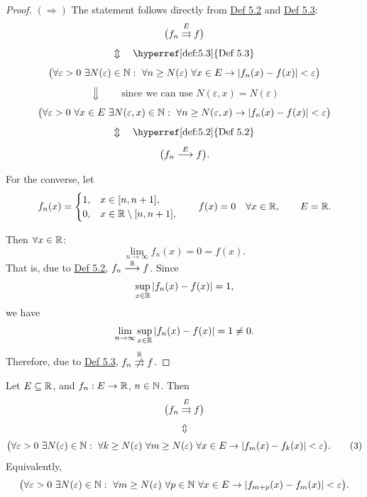 \begin{proof}
$(\Rightarrow)$ The statement follows directly from \hyperref[def:5.2]{Def 5.2} and \hyperref[def:5.3]{Def 5.3}:
\[
\bigl(f_n\mathrel{\overset{E}{\rightrightarrows}}f\bigr)
\]
\[
\Updownarrow\quad\text{\hyperref[def:5.3]{Def 5.3}}
\]
\[
\bigl(\forall\varepsilon>0\ \exists N(\varepsilon)\in\mathbb{N}:\ \forall n\ge N(\varepsilon)\ \forall x\in E
\to |f_n(x)-f(x)|<\varepsilon\bigr)
\]
\[
\Downarrow\qquad\text{since we can use }N(\varepsilon,x)=N(\varepsilon)
\]
\[
\bigl(\forall\varepsilon>0\ \forall x\in E\ \exists N(\varepsilon,x)\in\mathbb{N}:\ \forall n\ge N(\varepsilon,x)
\to |f_n(x)-f(x)|<\varepsilon\bigr)
\]
\[
\Updownarrow\quad\text{\hyperref[def:5.2]{Def 5.2}}
\]
\[
\bigl(f_n\mathrel{\overset{E}{\longrightarrow}}f\bigr).
\]

For the converse, let
\[
f_n(x)=
\begin{cases}
1,&x\in[n,n+1],\\
0,&x\in\mathbb{R}\setminus[n,n+1],
\end{cases}
\qquad
f(x)=0\quad\forall x\in\mathbb{R},
\qquad E=\mathbb{R}.
\]

Then $\forall x\in\mathbb{R}$:
\[
\lim_{n\to\infty}f_n(x)=0=f(x).
\]
That is, due to \hyperref[def:5.2]{Def 5.2}, $f_n\mathrel{\overset{\mathbb{R}}{\longrightarrow}}f$.
Since
\[
\sup_{x\in\mathbb{R}}|f_n(x)-f(x)|=1,
\]
we have
\[
\lim_{n\to\infty}\sup_{x\in\mathbb{R}}|f_n(x)-f(x)|=1\ne0.
\]
Therefore, due to \hyperref[def:5.3]{Def 5.3}, $f_n\nuconv{\R}f$.
\end{proof}

\begin{claim}\label{claim:5.4}
Let $E\subseteq\mathbb{R}$, and $f_n:E\to\mathbb{R}$, $n\in\mathbb{N}$.
Then
\[
\bigl(f_n\mathrel{\overset{E}{\rightrightarrows}}f\bigr)
\]
\[
\Updownarrow
\]
\[
\bigl(\forall\varepsilon>0\ \exists N(\varepsilon)\in\mathbb{N}:\ \forall k\ge N(\varepsilon)\ \forall m\ge N(\varepsilon)\ \forall x\in E
\to |f_m(x)-f_k(x)|<\varepsilon\bigr).
\tag{3}\label{eq:5:3:1}
\]
Equivalently,
\[
\bigl(\forall\varepsilon>0\ \exists N(\varepsilon)\in\N:\ \forall m\ge N(\varepsilon)\ \forall p\in\N\ \forall x\in E
\to |f_{m+p}(x)-f_m(x)|<\varepsilon\bigr).
\]
\end{claim}

